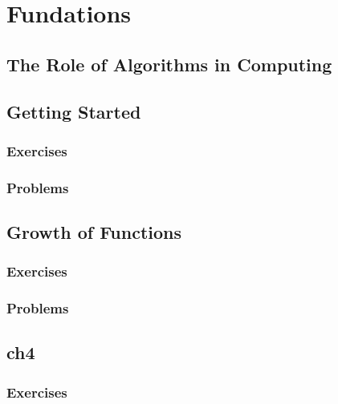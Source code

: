 \documentclass[a4paper, 11pt, fleqn]{report}
\begin{document}
    \tableofcontents
    \part{Fundations}
        \chapter{The Role of Algorithms in Computing}

        \chapter{Getting Started}
            \section*{Exercises}
                
                
                
            \section*{Problems}
                
                
                
                
        \chapter{Growth of Functions}
            \section*{Exercises}
                
                
            \section*{Problems}
                
                
        \chapter{ch4}
            \section*{Exercises}
                
                
\end{document}
